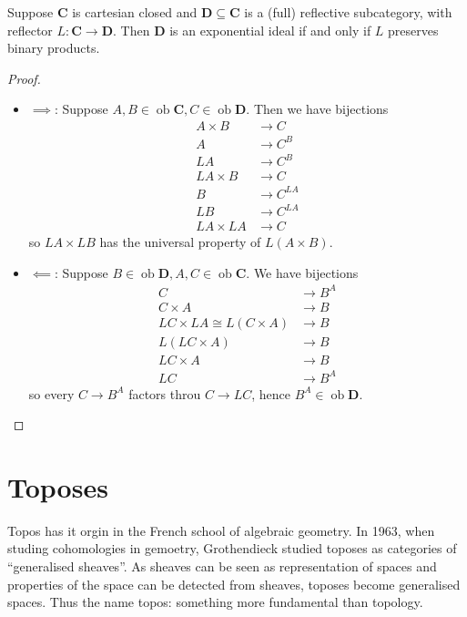 \documentclass[a4paper]{article}
\renewcommand{\c}[1]{\mathbf{#1}}
\DeclareMathOperator{\ob}{ob}
\begin{document}
\begin{lemma}
  Suppose \(\c C\) is cartesian closed and \(\c D \subseteq \c C\) is a (full) reflective subcategory, with reflector \(L: \c C \to \c D\). Then \(\c D\) is an exponential ideal if and only if \(L\) preserves binary products.
\end{lemma}

\begin{proof}\leavevmode
  \begin{itemize}
  \item \(\implies\): Suppose \(A, B \in \ob \c C, C \in \ob \c D\). Then we have bijections
    \begin{align*}
      A \times B &\to C \\
      A &\to C^B \\
      LA &\to C^B \\
      LA \times B &\to C \\
      B &\to C^{LA} \\
      LB &\to C^{LA} \\
      LA \times LA &\to C
    \end{align*}
    so \(LA \times LB\) has the universal property of \(L(A \times B)\).
  \item \(\impliedby\): Suppose \(B \in \ob \c D, A, C \in \ob \c C\). We have bijections
    \begin{align*}
      C &\to B^A \\
      C \times A &\to B \\
      LC \times LA \cong L(C \times A) &\to B \\
      L(LC \times A) &\to B \\
      LC \times A &\to B \\
      LC &\to B^A
    \end{align*}
    so every \(C \to B^A\) factors throu \(C \to LC\), hence \(B^A \in \ob \c D\).
  \end{itemize}
\end{proof}

\section{Toposes}

Topos has it orgin in the French school of algebraic geometry. In 1963, when studing cohomologies in gemoetry, Grothendieck studied toposes as categories of ``generalised sheaves''. As sheaves can be seen as representation of spaces and properties of the space can be detected from sheaves, toposes become generalised spaces. Thus the name topos: something more fundamental than topology.
\end{document}
